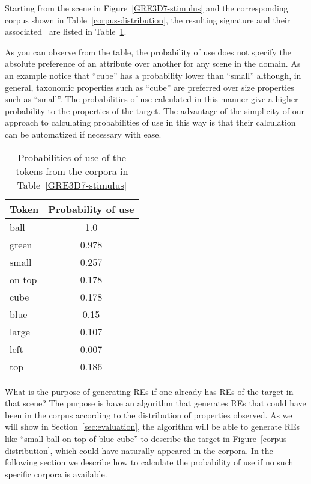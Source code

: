 

Starting from the scene in Figure~\ref{GRE3D7-stimulus} and the corresponding corpus shown in Table~\ref{corpus-distribution}, the resulting signature and their associated \puse\ are listed in Table~\ref{probability-of-use}. 

As you can observe from the table, the probability of use does not specify the absolute preference of an attribute over another for any scene in the domain. As an example notice that ``cube'' has a probability lower than ``small'' although, in general, taxonomic properties such as ``cube'' are preferred over size properties such as ``small''. The probabilities of use calculated in this manner give a higher probability to the properties of the target. The advantage of the simplicity of our approach to calculating probabilities of use in this way is that their calculation can be automatized if necessary with ease. 

\begin{table}[h!]
\begin{center}
\begin{tabular}{|l|c|}
\hline
Token & Probability of use \\
\hline
ball & 1.0 \\
green & 0.978 \\
small & 0.257 \\
on-top & 0.178 \\ 
cube & 0.178 \\
blue & 0.15 \\
large & 0.107 \\
left & 0.007 \\
top & 0.186 \\
\hline
\end{tabular}
\caption{Probabilities of use of the tokens from the corpora in Table~\ref{GRE3D7-stimulus}\label{probability-of-use}}
\end{center}
\end{table}

What is the purpose of generating REs if one already has REs of the target in that scene? The purpose is have an algorithm that generates REs that could have been in the corpus according to the distribution of properties observed. As we will show in Section~\ref{sec:evaluation}, the algorithm will be able to generate REs like ``small ball on top of blue cube'' to describe the target in Figure~\ref{corpus-distribution}, which could have naturally appeared in the corpora. In the following section we describe how to calculate the probability of use if no such specific corpora is available. 

